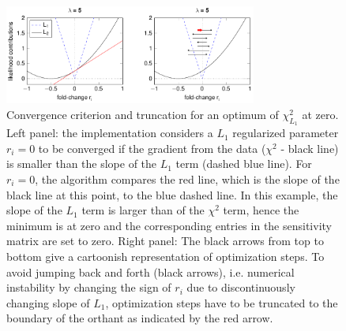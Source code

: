 \documentclass{bioinfo}
\begin{document}
\begin{figure}[!tpb]%
\centerline{\includegraphics[width=235pt]{Figures/l1_cartoon.pdf}}
\caption{Convergence criterion and truncation for an optimum of $\chi^2_{L_1}$ at zero. Left panel: the implementation considers a $L_1$ regularized parameter $r_i=0$ to be converged if the gradient from the data ($\chi^2$ - black line) is smaller than the slope of the $L_1$ term (dashed blue line). For $r_i=0$, the algorithm compares the red line, which is the slope of the black line at this point, to the blue dashed line. In this example, the slope of the $L_1$ term is larger than of the $\chi^2$ term, hence the minimum is at zero and the corresponding entries in the sensitivity matrix are set to zero. Right panel: The black arrows from top to bottom give a cartoonish representation of optimization steps. To avoid jumping back and forth (black arrows), i.e. numerical instability by changing the sign of $r_i$ due to discontinuously changing slope of $L_1$, optimization steps have to be truncated to the boundary of the orthant as indicated by the red arrow.}\label{fig:03}
\end{figure}
\end{document}
